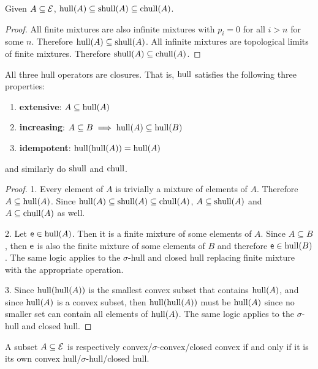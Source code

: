 \begin{mathSection}
\begin{coro}
	Given $A \subseteq \mathcal{E}$, $\mathrm{hull}(A) \subseteq \mathrm{shull}(A) \subseteq \mathrm{chull}(A)$.
\end{coro}

\begin{proof}
	All finite mixtures are also infinite mixtures with $p_i = 0$ for all $i > n$ for some $n$. Therefore $\mathrm{hull}(A) \subseteq \mathrm{shull}(A)$. All infinite mixtures are topological limits of finite mixtures. Therefore $\mathrm{shull}(A) \subseteq \mathrm{chull}(A)$. 
\end{proof}

\begin{prop}\label{pm-es-hullProp}
	All three hull operators are closures. That is, $\mathrm{hull}$ satisfies the following three properties:
	\begin{enumerate}
		\item \textbf{extensive}: $A \subseteq \mathrm{hull}(A)$
		\item \textbf{increasing}: $A \subseteq B \implies \mathrm{hull}(A) \subseteq \mathrm{hull}(B)$
		\item \textbf{idempotent}: $\mathrm{hull}(\mathrm{hull}(A)) = \mathrm{hull}(A)$
	\end{enumerate}
	and similarly do $\mathrm{shull}$ and $\mathrm{chull}$.
\end{prop}

\begin{proof}
	1. Every element of $A$ is trivially a mixture of elements of $A$. Therefore $A \subseteq \mathrm{hull}(A)$. Since $\mathrm{hull}(A) \subseteq \mathrm{shull}(A) \subseteq \mathrm{chull}(A)$, $A \subseteq \mathrm{shull}(A)$ and $A \subseteq \mathrm{chull}(A)$ as well. 
	
	2. Let $\mathsf{e} \in \mathrm{hull}(A)$. Then it is a finite mixture of some elements of $A$. Since $A \subseteq B$, then $\mathsf{e}$ is also the finite mixture of some elements of $B$ and therefore $\mathsf{e} \in \mathrm{hull}(B)$. The same logic applies to the $\sigma$-hull and closed hull replacing finite mixture with the appropriate operation.
	
	3. Since $\mathrm{hull}(\mathrm{hull}(A))$ is the smallest convex subset that contains $\mathrm{hull}(A)$, and since $\mathrm{hull}(A)$ is a convex subset, then $\mathrm{hull}(\mathrm{hull}(A))$ must be $\mathrm{hull}(A)$ since no smaller set can contain all elements of $\mathrm{hull}(A)$. The same logic applies to the $\sigma$-hull and closed hull.
\end{proof}

\begin{coro}
	A subset $A \subseteq \mathcal{E}$ is respectively convex/$\sigma$-convex/closed convex if and only if it is its own convex hull/$\sigma$-hull/closed hull.
\end{coro}


\end{mathSection}
